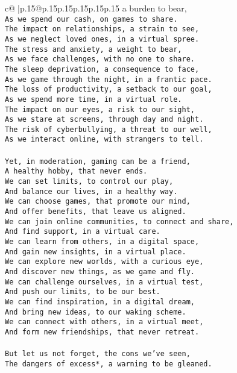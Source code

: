 \documentclass{article}
\begin{document}
{\begin{supertabular}{c@{$\;$}|p{.15\linewidth}@{}p{.15\linewidth}p{.15\linewidth}p{.15\linewidth}p{.15\linewidth}p{.15\linewidth}}
{{{a burden to bear,\\ \tt As we spend our cash, on games to share.\\ \tt The impact on relationships, a strain to see,\\ \tt As we neglect loved ones, in a virtual spree.\\ \tt The stress and anxiety, a weight to bear,\\ \tt As we face challenges, with no one to share.\\ \tt The sleep deprivation, a consequence to face,\\ \tt As we game through the night, in a frantic pace.\\ \tt The loss of productivity, a setback to our goal,\\ \tt As we spend more time, in a virtual role.\\ \tt The impact on our eyes, a risk to our sight,\\ \tt As we stare at screens, through day and night.\\ \tt The risk of cyberbullying, a threat to our well,\\ \tt As we interact online, with strangers to tell.\\ \tt \\ \tt Yet, in moderation, gaming can be a friend,\\ \tt A healthy hobby, that never ends.\\ \tt We can set limits, to control our play,\\ \tt And balance our lives, in a healthy way.\\ \tt We can choose games, that promote our mind,\\ \tt And offer benefits, that leave us aligned.\\ \tt We can join online communities, to connect and share,\\ \tt And find support, in a virtual care.\\ \tt We can learn from others, in a digital space,\\ \tt And gain new insights, in a virtual place.\\ \tt We can explore new worlds, with a curious eye,\\ \tt And discover new things, as we game and fly.\\ \tt We can challenge ourselves, in a virtual test,\\ \tt And push our limits, to be our best.\\ \tt We can find inspiration, in a digital dream,\\ \tt And bring new ideas, to our waking scheme.\\ \tt We can connect with others, in a virtual meet,\\ \tt And form new friendships, that never retreat.\\ \tt \\ \tt But let us not forget, the cons we've seen,\\ \tt *The dangers of excess*, a warning to be gleaned.\\ \tt }}}
\end{supertabular}}
\end{document}
